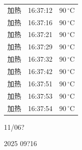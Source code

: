 \documentclass[UTF8,10pt,a4paper,fontset=fandol]{ctexart}
\newcommand{\fieldvalue}[1]{#1}
\newcommand{\handwritten}[1]{#1}
\begin{document}
\begin{tabularx}{\textwidth}{@{}l l X@{}}
加热 & 
\fieldvalue{16:37:12} &
\fieldvalue{$90\,^{\circ}\mathrm{C}$} \\

加热 & 
\fieldvalue{16:37:16} &
\fieldvalue{$90\,^{\circ}\mathrm{C}$} \\

加热 & 
\fieldvalue{16:37:21} &
\fieldvalue{$90\,^{\circ}\mathrm{C}$} \\

加热 & 
\fieldvalue{16:37:29} &
\fieldvalue{$90\,^{\circ}\mathrm{C}$} \\

加热 & 
\fieldvalue{16:37:32} &
\fieldvalue{$90\,^{\circ}\mathrm{C}$} \\

加热 & 
\fieldvalue{16:37:42} &
\fieldvalue{$90\,^{\circ}\mathrm{C}$} \\

加热 & 
\fieldvalue{16:37:51} &
\fieldvalue{$90\,^{\circ}\mathrm{C}$} \\

加热 & 
\fieldvalue{16:37:53} &
\fieldvalue{$90\,^{\circ}\mathrm{C}$} \\

加热 & 
\fieldvalue{16:37:54} &
\fieldvalue{$90\,^{\circ}\mathrm{C}$} \\
\end{tabularx}

\vspace{1em}

\handwritten{11/06?}

\handwritten{2025 09?16}
\end{document}
